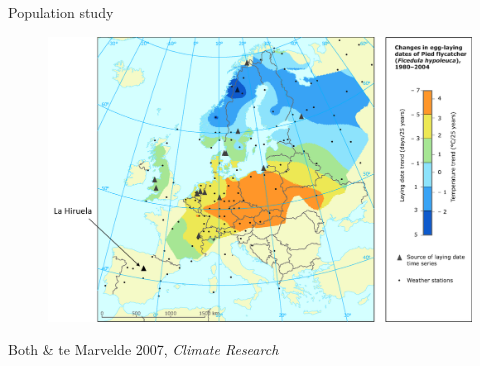 \documentclass[compress]{beamer}
\begin{document}
\begin{frame}{Population study}

\begin{figure}
\centering
      \includegraphics[height = 7 cm]{Image/map.png} 
\end{figure}
\raggedleft
      \tiny{Both \& te Marvelde 2007, \textit{Climate Research}}

\end{frame}
\end{document}
